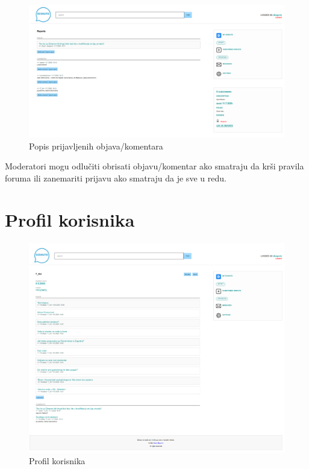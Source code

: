 \documentclass{foi}
\begin{document}
\begin{figure}[h!]
    \centering
    \includegraphics[width=1\textwidth]{slike/prijave.png}
    \caption{Popis prijavljenih objava/komentara}
\end{figure}

Moderatori mogu odlučiti obrisati objavu/komentar ako smatraju da krši pravila foruma ili zanemariti prijavu ako smatraju da je sve u redu.

\section{Profil korisnika}

\begin{figure}[h!]
    \centering
    \includegraphics[width=1\textwidth]{slike/profil.png}
    \caption{Profil korisnika}
    \label{profil}
\end{figure}
\end{document}
